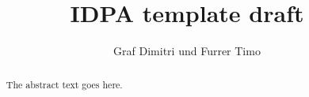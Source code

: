 \documentclass{article}
\begin{document}
\title{IDPA template draft}
\author{Graf Dimitri und Furrer Timo}

\maketitle

\begin{abstract}
The abstract text goes here.
\end{abstract}


\end{document}
